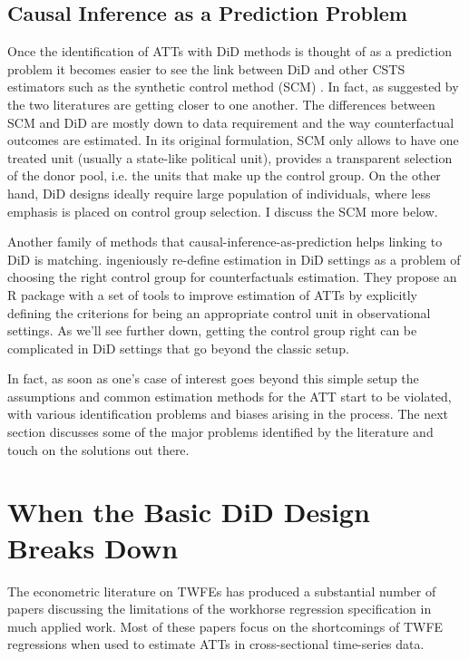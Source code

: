 \documentclass[hidelinks]{article}\usepackage[]{graphicx}\usepackage[]{xcolor}
\begin{document}
\subsection{Causal Inference as a Prediction Problem}

Once the identification of ATTs with DiD methods is thought of as a prediction problem it becomes easier to see the link between DiD and other CSTS estimators such as the synthetic control method (SCM) \parencite{Abadie2010}. In fact, as suggested by \textcite{Roth2022} the two literatures are getting closer to one another. The differences between SCM and DiD are mostly down to data requirement and the way counterfactual outcomes are estimated. In its original formulation, SCM only allows to have one treated unit (usually a state-like political unit), provides a transparent selection of the donor pool, i.e. the units that make up the control group. On the other hand, DiD designs ideally require large population of individuals, where less emphasis is placed on control group selection. I discuss the SCM more below.

Another family of methods that causal-inference-as-prediction helps linking to DiD is matching. \textcite{Imai2021} ingeniously re-define estimation in DiD settings as a problem of choosing the right control group for counterfactuals estimation. They propose an R package with a set of tools to improve estimation of ATTs by explicitly defining the criterions for being an appropriate control unit in observational settings. As we'll see further down, getting the control group right can be complicated in DiD settings that go beyond the classic setup.

In fact, as soon as one's case of interest goes beyond this simple setup the assumptions and common estimation methods for the ATT start to be violated, with various identification problems and biases arising in the process. The next section discusses some of the major problems identified by the literature and touch on the solutions out there.


\section{When the Basic DiD Design Breaks Down}

The econometric literature on TWFEs has produced a substantial number of papers discussing the limitations of the workhorse regression specification in much applied work. Most of these papers focus on the shortcomings of TWFE regressions when used to estimate ATTs in cross-sectional time-series data.
\end{document}
